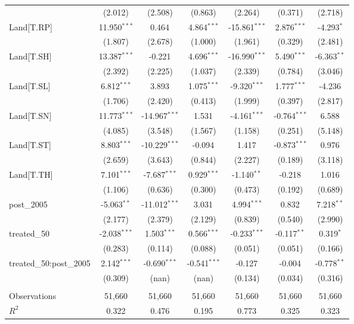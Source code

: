 \begin{table}[!htbp]
\begin{tabular}{@{\extracolsep{5pt}}lcccccc}
  & (2.012) & (2.508) & (0.863) & (2.264) & (0.371) & (2.718) \\
 Land[T.RP] & 11.950$^{***}$ & 0.464$^{}$ & 4.864$^{***}$ & -15.861$^{***}$ & 2.876$^{***}$ & -4.293$^{*}$ \\
  & (1.807) & (2.678) & (1.000) & (1.961) & (0.329) & (2.481) \\
 Land[T.SH] & 13.387$^{***}$ & -0.221$^{}$ & 4.696$^{***}$ & -16.990$^{***}$ & 5.490$^{***}$ & -6.363$^{**}$ \\
  & (2.392) & (2.225) & (1.037) & (2.339) & (0.784) & (3.046) \\
 Land[T.SL] & 6.812$^{***}$ & 3.893$^{}$ & 1.075$^{***}$ & -9.320$^{***}$ & 1.777$^{***}$ & -4.236$^{}$ \\
  & (1.706) & (2.420) & (0.413) & (1.999) & (0.397) & (2.817) \\
 Land[T.SN] & 11.773$^{***}$ & -14.967$^{***}$ & 1.531$^{}$ & -4.161$^{***}$ & -0.764$^{***}$ & 6.588$^{}$ \\
  & (4.085) & (3.548) & (1.567) & (1.158) & (0.251) & (5.148) \\
 Land[T.ST] & 8.803$^{***}$ & -10.229$^{***}$ & -0.094$^{}$ & 1.417$^{}$ & -0.873$^{***}$ & 0.976$^{}$ \\
  & (2.659) & (3.643) & (0.844) & (2.227) & (0.189) & (3.118) \\
 Land[T.TH] & 7.101$^{***}$ & -7.687$^{***}$ & 0.929$^{***}$ & -1.140$^{**}$ & -0.218$^{}$ & 1.016$^{}$ \\
  & (1.106) & (0.636) & (0.300) & (0.473) & (0.192) & (0.689) \\
 post_2005 & -5.063$^{**}$ & -11.012$^{***}$ & 3.031$^{}$ & 4.994$^{***}$ & 0.832$^{}$ & 7.218$^{**}$ \\
  & (2.177) & (2.379) & (2.129) & (0.839) & (0.540) & (2.990) \\
 treated_50 & -2.038$^{***}$ & 1.503$^{***}$ & 0.566$^{***}$ & -0.233$^{***}$ & -0.117$^{**}$ & 0.319$^{*}$ \\
  & (0.283) & (0.114) & (0.088) & (0.051) & (0.051) & (0.166) \\
 treated_50:post_2005 & 2.142$^{***}$ & -0.690$^{***}$ & -0.541$^{***}$ & -0.127$^{}$ & -0.004$^{}$ & -0.778$^{**}$ \\
  & (0.309) & (nan) & (nan) & (0.134) & (0.034) & (0.316) \\
\hline \\[-1.8ex]
 Observations & 51,660 & 51,660 & 51,660 & 51,660 & 51,660 & 51,660 \\
 $R^2$ & 0.322 & 0.476 & 0.195 & 0.773 & 0.325 & 0.323 \\

\end{tabular}
\end{table}
